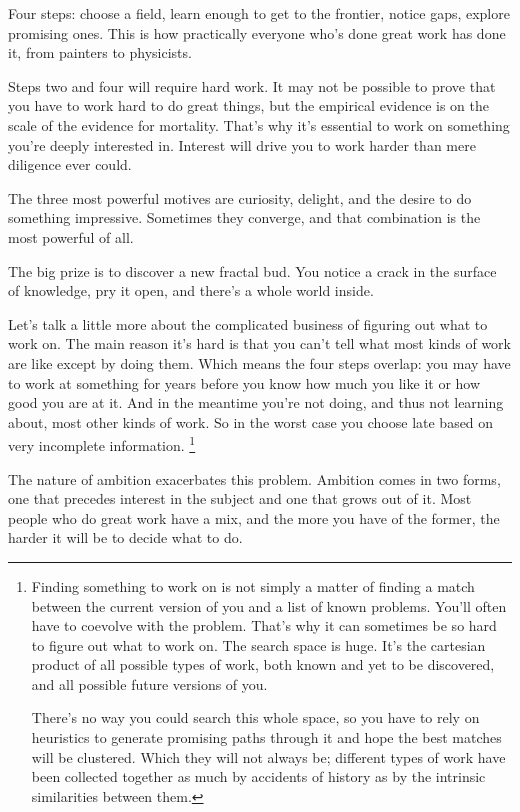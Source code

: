 Four steps: choose a field, learn enough to get to the frontier, notice
gaps, explore promising ones. This is how practically everyone who's
done great work has done it, from painters to physicists.

Steps two and four will require hard work. It may not be possible to
prove that you have to work hard to do great things, but the empirical
evidence is on the scale of the evidence for mortality. That's why it's
essential to work on something you're deeply interested in. Interest
will drive you to work harder than mere diligence ever could.

The three most powerful motives are curiosity, delight, and the desire
to do something impressive. Sometimes they converge, and that
combination is the most powerful of all.

The big prize is to discover a new fractal bud. You notice a crack in
the surface of knowledge, pry it open, and there's a whole world inside.

Let's talk a little more about the complicated business of figuring out
what to work on. The main reason it's hard is that you can't tell what
most kinds of work are like except by doing them. Which means the four
steps overlap: you may have to work at something for years before you
know how much you like it or how good you are at it. And in the meantime
you're not doing, and thus not learning about, most other kinds of work.
So in the worst case you choose late based on very incomplete
information. \footnote{Finding something to work on is not simply a matter of finding a
match between the current version of you and a list of known problems.
You'll often have to coevolve with the problem. That's why it can
sometimes be so hard to figure out what to work on. The search space is
huge. It's the cartesian product of all possible types of work, both
known and yet to be discovered, and all possible future versions of you.

There's no way you could search this whole space, so you have to rely on
heuristics to generate promising paths through it and hope the best
matches will be clustered. Which they will not always be; different
types of work have been collected together as much by accidents of
history as by the intrinsic similarities between them.}

The nature of ambition exacerbates this problem. Ambition comes in two
forms, one that precedes interest in the subject and one that grows out
of it. Most people who do great work have a mix, and the more you have
of the former, the harder it will be to decide what to do.

